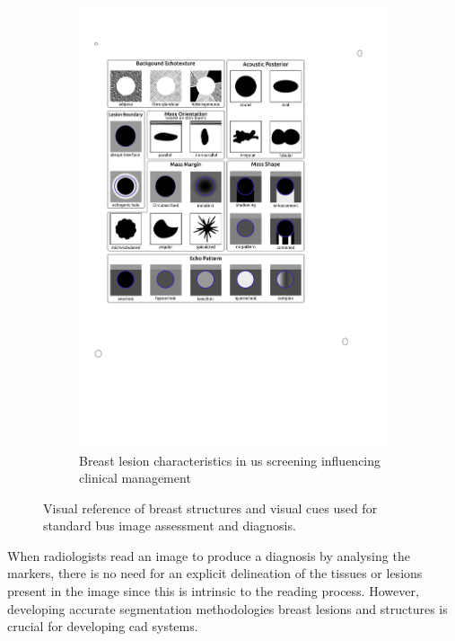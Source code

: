 \begin{figure}
\begin{subfigure}[b]{0.4\textwidth}
        \includegraphics[trim = 65 345 200 124, clip,width=\textwidth]{birads}
        \caption[]%
        {Breast lesion characteristics in \ac{us} screening influencing clinical management~\cite{raza2010us}}    
        \label{fig:lesions:lesions}
    \end{subfigure}
    \caption {{\small Visual reference of breast structures and visual cues used for standard \ac{bus} image assessment and diagnosis.}} 
    \label{fig:lesions}
\end{figure}

When radiologists read an image to produce a diagnosis by analysing the markers, there is no need for an explicit delineation of the tissues or lesions present in the image since this is intrinsic to the reading process.
However, developing accurate segmentation methodologies breast lesions and structures is crucial for developing \ac{cad} systems.

